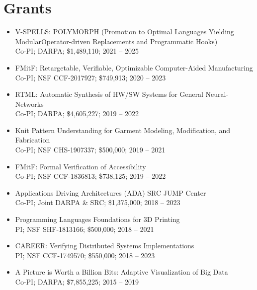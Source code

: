 \documentclass[10pt]{article}
\begin{document}


\section*{Grants}

\begin{itemize}
  \item
    V-SPELLS: POLYMORPH (Promotion to Optimal Languages Yielding
    ModularOperator-driven Replacements and Programmatic Hooks) \\
    Co-PI; DARPA; \$1,489,110; 2021 -- 2025

  \item
    FMitF: Retargetable, Verifiable, Optimizable Computer-Aided Manufacturing \\
    Co-PI; NSF CCF-2017927; \$749,913; 2020 -- 2023

  \item
    RTML: Automatic Synthesis of HW/SW Systems for General Neural-Networks \\
    Co-PI; DARPA; \$4,605,227; 2019 -- 2022

  \item
    Knit Pattern Understanding for Garment Modeling, Modification, and Fabrication \\
    Co-PI; NSF CHS-1907337; \$500,000; 2019 -- 2021

  \item
    FMitF: Formal Verification of Accessibility \\
    Co-PI; NSF CCF-1836813; \$738,125; 2019 -- 2022

  \item
    Applications Driving Architectures (ADA) SRC JUMP Center \\
    Co-PI; Joint DARPA \& SRC; \$1,375,000; 2018 -- 2023

  \item
    Programming Languages Foundations for 3D Printing \\
    PI; NSF SHF-1813166; \$500,000; 2018 -- 2021

  \item
    CAREER: Verifying Distributed Systems Implementations \\
    PI; NSF CCF-1749570; \$550,000; 2018 -- 2023

  \item
    A Picture is Worth a Billion Bits: Adaptive Visualization of Big Data \\
    Co-PI; DARPA; \$7,855,225; 2015 -- 2019
\end{itemize}
\end{document}
